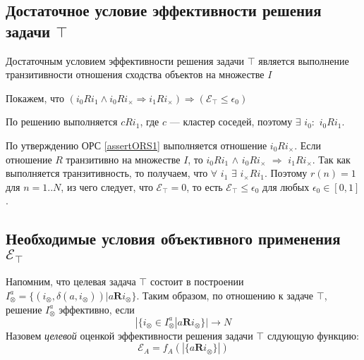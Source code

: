 \subsection{Достаточное условие эффективности решения задачи $\top$}
\begin{assert}
Достаточным условием эффективности решения задачи $\top$ является выполнение транзитивности отношения сходства объектов на множестве $I$
\end{assert}
Покажем, что $(i_0 \mathit{R} i_{1} \wedge i_0 \mathit{R} i_{\times}  
\Rightarrow i_{1} \mathit{R} i_{\times}) \Rightarrow (\mathcal{E}_{\top} \le \epsilon_0)$

\begin{myproof}
По решению выполняется $c \mathit{R} i_{1}$, где $c$ --- кластер соседей, поэтому $\exists$ $i_0:$ $i_0 \mathit{R} i_{1}$.
\end{myproof}

По утверждению ОРС \ref{assertORS1} выполняется отношение $i_0 \mathit{R} i_{\times}$. Если отношение $\mathit{R}$ транзитивно
на множестве $I$, то $i_0 \mathit{R} i_{1}$ $\wedge$ $i_0 \mathit{R} i_{\times}$ $\Rightarrow$ $i_1 \mathit{R} i_{\times}$.
Так как выполняется транзитивность, то получаем, что $\forall$ $i_1$ $\exists$ $i_{\times} \mathit{R} i_1$. 
Поэтому $r(n) = 1$ для $n=1..N$, из чего следует, что $\mathcal{E}_{\top} = 0$, то есть $\mathcal{E}_{\top} \le \epsilon_0$ для любых $\epsilon_0 \in [0,1]$. 

\subsection{Необходимые условия объективного применения $\mathcal{E}_{\top}$}

Напомним, что целевая задача $\top$ состоит в построении $I^a_{\otimes} = \{ (i_{\otimes}, \delta(a, i_{\otimes})) |  a \mathbf{R} i_{\otimes} \}$.
Таким образом, по отношению к задаче $\top$, решение $I^a_{\otimes}$ эффективно, если 
\begin{equation}
|\{ i_{\otimes} \in I^a_{\otimes} | a \mathbf{R} i_{\otimes} \}| \rightarrow N
\end{equation}
Назовем {\it целевой} оценкой эффективности решения задачи $\top$ слдующую функцию:
\begin{equation}
\mathcal{E}_A = f_A (|\{ a \mathbf{R} i_{\otimes} \}|)
\end{equation}

